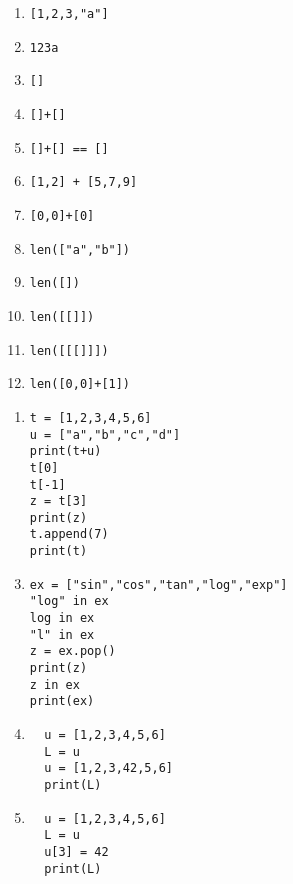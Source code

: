 \begin{multicols}{2}
  \begin{enumerate}[label=\emph{\alph*)}]
    \item \texttt{[1,2,3,"a"]}
    \item \texttt{123a}
    \item \texttt{[]}
    \item \texttt{[]+[]}
    \item \texttt{[]+[] == []}
    \item \texttt{[1,2] + [5,7,9]}
    \item \texttt{[0,0]+[0]}
    \item \texttt{len(["a","b"])}
    \item \texttt{len([])}
    \item \texttt{len([[]])}
    \item \texttt{len([[[]]])}
    \item \texttt{len([0,0]+[1])}
  \end{enumerate}
\end{multicols}


\begin{enumerate}[label=\emph{\alph*)}]
\item 
\begin{lstlisting}
t = [1,2,3,4,5,6]
u = ["a","b","c","d"]
print(t+u)
t[0]
t[-1]
z = t[3]
print(z)
t.append(7)
print(t)
\end{lstlisting}
\end{enumerate}
\begin{enumerate}[label=\emph{\alph*)}]
\setcounter{enumi}{2}
\item
\begin{lstlisting}
ex = ["sin","cos","tan","log","exp"]
"log" in ex
log in ex
"l" in ex
z = ex.pop()
print(z)
z in ex
print(ex)
\end{lstlisting}
\end{enumerate}
\begin{enumerate}[label=\emph{\alph*)}]
\setcounter{enumi}{3}
\item 
\begin{lstlisting}
  u = [1,2,3,4,5,6]
  L = u
  u = [1,2,3,42,5,6]
  print(L)
\end{lstlisting}
\end{enumerate}
\begin{enumerate}[label=\emph{\alph*)}]
\setcounter{enumi}{4}
\item
\begin{lstlisting}
  u = [1,2,3,4,5,6]
  L = u
  u[3] = 42
  print(L)
\end{lstlisting}
\end{enumerate}


